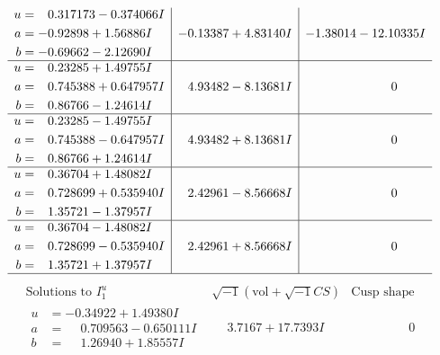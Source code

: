 \documentclass[1p]{elsarticle_modified}
\theoremstyle{definition}
\newcommand{\I}{\sqrt{-1}}
\begin{document}
$$\begin{array}{c|c|c}
\begin{aligned}
u &= \phantom{-}0.317173 - 0.374066 I \\
a &= -0.92898 + 1.56886 I \\
b &= -0.69662 - 2.12690 I\end{aligned}
 & -0.13387 + 4.83140 I & -1.38014 - 12.10335 I \\ \hline\begin{aligned}
u &= \phantom{-}0.23285 + 1.49755 I \\
a &= \phantom{-}0.745388 + 0.647957 I \\
b &= \phantom{-}0.86766 - 1.24614 I\end{aligned}
 & \phantom{-}4.93482 - 8.13681 I & \phantom{-0.000000 } 0 \\ \hline\begin{aligned}
u &= \phantom{-}0.23285 - 1.49755 I \\
a &= \phantom{-}0.745388 - 0.647957 I \\
b &= \phantom{-}0.86766 + 1.24614 I\end{aligned}
 & \phantom{-}4.93482 + 8.13681 I & \phantom{-0.000000 } 0 \\ \hline\begin{aligned}
u &= \phantom{-}0.36704 + 1.48082 I \\
a &= \phantom{-}0.728699 + 0.535940 I \\
b &= \phantom{-}1.35721 - 1.37957 I\end{aligned}
 & \phantom{-}2.42961 - 8.56668 I & \phantom{-0.000000 } 0 \\ \hline\begin{aligned}
u &= \phantom{-}0.36704 - 1.48082 I \\
a &= \phantom{-}0.728699 - 0.535940 I \\
b &= \phantom{-}1.35721 + 1.37957 I\end{aligned}
 & \phantom{-}2.42961 + 8.56668 I & \phantom{-0.000000 } 0\\
 \hline 
 \end{array}$$\newpage$$\begin{array}{c|c|c}  
\text{Solutions to }I^u_{1}& \I (\text{vol} + \sqrt{-1}CS) & \text{Cusp shape}\\
 \hline 
\begin{aligned}
u &= -0.34922 + 1.49380 I \\
a &= \phantom{-}0.709563 - 0.650111 I \\
b &= \phantom{-}1.26940 + 1.85557 I\end{aligned}
 & \phantom{-}3.7167 + 17.7393 I & \phantom{-0.000000 } 0 \\ \hline\begin{aligned}

\end{aligned}
\end{array}$$
\end{document}
